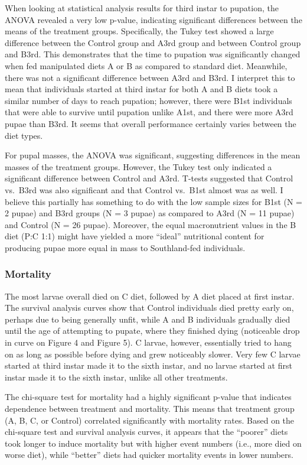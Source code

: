 \documentclass[12pt,]{article}
\begin{document}
When looking at statistical analysis results for third instar to
pupation, the ANOVA revealed a very low p-value, indicating significant
differences between the means of the treatment groups. Specifically, the
Tukey test showed a large difference between the Control group and A3rd
group and between Control group and B3rd. This demonstrates that the
time to pupation was significantly changed when fed manipulated diets A
or B as compared to standard diet. Meanwhile, there was not a
significant difference between A3rd and B3rd. I interpret this to mean
that individuals started at third instar for both A and B diets took a
similar number of days to reach pupation; however, there were B1st
individuals that were able to survive until pupation unlike A1st, and
there were more A3rd pupae than B3rd. It seems that overall performance
certainly varies between the diet types.

For pupal masses, the ANOVA was significant, suggesting differences in
the mean masses of the treatment groups. However, the Tukey test only
indicated a significant difference between Control and A3rd. T-tests
suggested that Control vs.~B3rd was also significant and that Control
vs.~B1st almost was as well. I believe this partially has something to
do with the low sample sizes for B1st (N = 2 pupae) and B3rd groups (N =
3 pupae) as compared to A3rd (N = 11 pupae) and Control (N = 26 pupae).
Moreover, the equal macronutrient values in the B diet (P:C 1:1) might
have yielded a more ``ideal'' nutritional content for producing pupae
more equal in mass to Southland-fed individuals.

\hypertarget{mortality-2}{%
\subsubsection{Mortality}\label{mortality-2}}

The most larvae overall died on C diet, followed by A diet placed at
first instar. The survival analysis curves show that Control individuals
died pretty early on, perhaps due to being generally unfit, while A and
B individuals gradually died until the age of attempting to pupate,
where they finished dying (noticeable drop in curve on Figure 4 and
Figure 5). C larvae, however, essentially tried to hang on as long as
possible before dying and grew noticeably slower. Very few C larvae
started at third instar made it to the sixth instar, and no larvae
started at first instar made it to the sixth instar, unlike all other
treatments.

The chi-square test for mortality had a highly significant p-value that
indicates dependence between treatment and mortality. This means that
treatment group (A, B, C, or Control) correlated significantly with
mortality rates. Based on the chi-square test and survival analysis
curves, it appears that the ``poorer'' diets took longer to induce
mortality but with higher event numbers (i.e., more died on worse diet),
while ``better'' diets had quicker mortality events in lower numbers.
\end{document}
